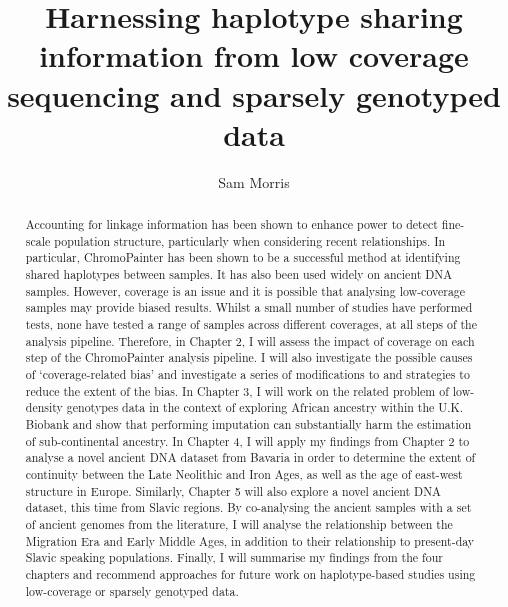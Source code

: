 
\title{Harnessing haplotype sharing information from low coverage sequencing and sparsely genotyped data }
\author{Sam Morris}

\maketitle
\makedeclaration

\begin{abstract} %
Accounting for linkage information has been shown to enhance power to detect fine-scale population structure, particularly when considering recent relationships. In particular, ChromoPainter has been shown to be a successful method at identifying shared haplotypes between samples. It has also been used widely on ancient DNA samples. However, coverage is an issue and it is possible that analysing low-coverage samples may provide biased results. Whilst a small number of studies have performed tests, none have tested a range of samples across different coverages, at all steps of the analysis pipeline. Therefore, in Chapter 2, I will assess the impact of coverage on each step of the ChromoPainter analysis pipeline. I will also investigate the possible causes of `coverage-related bias' and investigate a series of modifications to and strategies to reduce the extent of the bias. In Chapter 3, I will work on the related problem of low-density genotypes data in the context of exploring African ancestry within the U.K. Biobank and show that performing imputation can substantially harm the estimation of sub-continental ancestry. In Chapter 4, I will apply my findings from Chapter 2 to analyse a novel ancient DNA dataset from Bavaria in order to determine the extent of continuity between the Late Neolithic and Iron Ages, as well as the age of east-west structure in Europe. Similarly, Chapter 5 will also explore a novel ancient DNA dataset, this time from Slavic regions. By co-analysing the ancient samples with a set of ancient genomes from the literature, I will analyse the relationship between the Migration Era and Early Middle Ages, in addition to their relationship to present-day Slavic speaking populations. Finally, I will summarise my findings from the four chapters and recommend approaches for future work on haplotype-based studies using low-coverage or sparsely genotyped data. 


\end{abstract}

